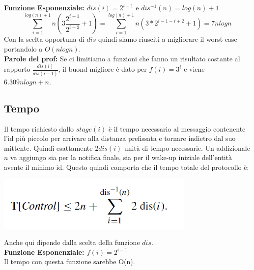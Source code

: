 \textbf{Funzione Esponenziale: $dis(i) = 2^{i-1}$} e $dis^{-1}(n) =log(n) + 1$
$$\sum_{i=1}^{log(n) + 1 }n(3\frac{2^{i-1}}{2^{i-2}} + 1) = \sum_{i=1}^{log(n) + 1 }n(3 * 2^{i-1-i+2}+1) =  7nlogn$$
Con la scelta opportuna di $dis$ quindi siamo riusciti a migliorare il worst case portandolo a $O(nlogn)$.\\
\textbf{Parole del prof:} Se ci limitiamo a funzioni che fanno un risultato costante al rapporto $\frac{dis(i)}{dis(i-1)}$, il buond migliore è dato per $f(i) = 3^i$ e viene $6.309 n log n + n$.
\subsection{Tempo}
Il tempo richiesto dallo $stage(i)$ è il tempo necessario al messaggio contenente l'id più piccolo per arrivare alla distanza prefissata e tornare indietro dal suo mittente. Quindi esattamente $2dis(i)$ unità di tempo necessarie. Un addizionale $n$ va aggiungo sia per la notifica finale, sia per il wake-up iniziale dell'entità avente il minimo id. Questo quindi comporta che il tempo totale del protocollo è:
\begin{center}
    \includegraphics[scale=0.6]{aa/ee.png}
\end{center}
Anche qui dipende dalla scelta della funzione $dis$.\\
\textbf{Funzione Esponenziale: $f(i) = 2^{i-1}$}\\
Il tempo con questa funzione sarebbe O(n).

